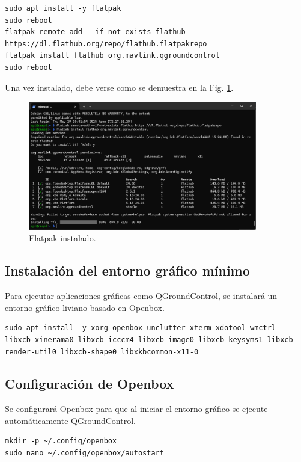\documentclass[12pt]{article}
\begin{document}
\begin{lstlisting}
sudo apt install -y flatpak
sudo reboot
flatpak remote-add --if-not-exists flathub https://dl.flathub.org/repo/flathub.flatpakrepo
flatpak install flathub org.mavlink.qgroundcontrol
sudo reboot
\end{lstlisting}

Una vez instalado, debe verse como se demuestra en la Fig. \ref{flatpak}.

\begin{figure}[H]
    \centering
    \includegraphics[width=10cm]{flatpak_installed.png}
    \caption{Flatpak instalado.}
    \label{flatpak}
\end{figure}

\subsection{Instalación del entorno gráfico mínimo}

Para ejecutar aplicaciones gráficas como QGroundControl, se instalará un entorno gráfico liviano basado en Openbox.

\begin{lstlisting}
sudo apt install -y xorg openbox unclutter xterm xdotool wmctrl libxcb-xinerama0 libxcb-icccm4 libxcb-image0 libxcb-keysyms1 libxcb-render-util0 libxcb-shape0 libxkbcommon-x11-0
\end{lstlisting}

\subsection{Configuración de Openbox}

Se configurará Openbox para que al iniciar el entorno gráfico se ejecute automáticamente QGroundControl.

\begin{lstlisting}
mkdir -p ~/.config/openbox
sudo nano ~/.config/openbox/autostart
\end{lstlisting}
\end{document}
